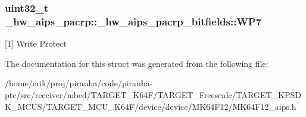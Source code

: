 \subsubsection[{\texorpdfstring{W\+P7}{WP7}}]{\setlength{\rightskip}{0pt plus 5cm}uint32\+\_\+t \+\_\+hw\+\_\+aips\+\_\+pacrp\+::\+\_\+hw\+\_\+aips\+\_\+pacrp\+\_\+bitfields\+::\+W\+P7}\hypertarget{struct__hw__aips__pacrp_1_1__hw__aips__pacrp__bitfields_a5dea1a3f146d3a8af9dad264db3874c7}{}\label{struct__hw__aips__pacrp_1_1__hw__aips__pacrp__bitfields_a5dea1a3f146d3a8af9dad264db3874c7}
\mbox{[}1\mbox{]} Write Protect 

The documentation for this struct was generated from the following file\+:\begin{DoxyCompactItemize}
\item 
/home/erik/proj/piranha/code/piranha-\/ptc/src/receiver/mbed/\+T\+A\+R\+G\+E\+T\+\_\+\+K64\+F/\+T\+A\+R\+G\+E\+T\+\_\+\+Freescale/\+T\+A\+R\+G\+E\+T\+\_\+\+K\+P\+S\+D\+K\+\_\+\+M\+C\+U\+S/\+T\+A\+R\+G\+E\+T\+\_\+\+M\+C\+U\+\_\+\+K64\+F/device/device/\+M\+K64\+F12/M\+K64\+F12\+\_\+aips.\+h\end{DoxyCompactItemize}
